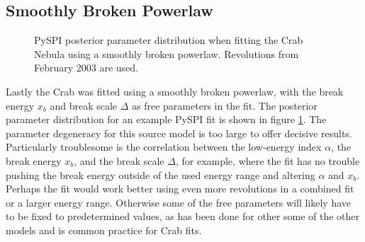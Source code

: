 \documentclass{report}
\begin{document}
\FloatBarrier

\subsection{Smoothly Broken Powerlaw}
\begin{figure}[h]
  \centering
  \caption{PySPI posterior parameter distribution when fitting the Crab Nebula using a smoothly broken powerlaw. Revolutions from February 2003 are used.}
  \label{fig sm br pl fit param}
\end{figure}

Lastly the Crab was fitted using a smoothly broken powerlaw, with the break energy $x_b$ and break scale $\Delta$ as free parameters in the fit. The posterior parameter distribution for an example PySPI fit is shown in figure \ref{fig sm br pl fit param}. The parameter degeneracy for this source model is too large to offer decisive results. Particularly troublesome is the correlation between the low-energy index $\alpha$, the break energy $x_b$, and the break scale $\Delta$, for example, where the fit has no trouble pushing the break energy outside of the used energy range and altering $\alpha$ and $x_b$. Perhaps the fit would work better using even more revolutions in a combined fit or a larger energy range. Otherwise some of the free parameters will likely have to be fixed to predetermined values, as has been done for other some of the other models and is common practice for Crab fits. 
\end{document}
